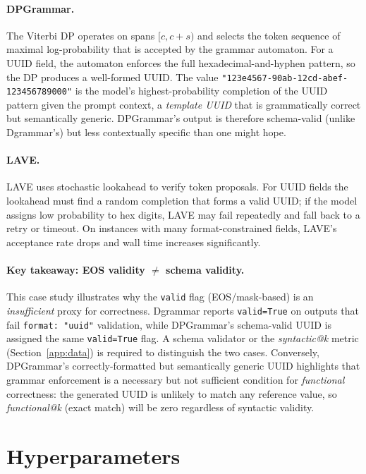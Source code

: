 \paragraph{DPGrammar.}
The Viterbi DP operates on spans $[c, c{+}s)$ and selects the token sequence of maximal log-probability that is accepted by the grammar automaton.
For a UUID field, the automaton enforces the full hexadecimal-and-hyphen pattern, so the DP produces a well-formed UUID.
The value \texttt{"123e4567-90ab-12cd-abef-123456789000"} is the model's highest-probability completion of the UUID pattern given the prompt context, a \emph{template UUID} that is grammatically correct but semantically generic.
DPGrammar's output is therefore schema-valid (unlike Dgrammar's) but less contextually specific than one might hope.

\paragraph{LAVE.}
LAVE uses stochastic lookahead to verify token proposals.
For UUID fields the lookahead must find a random completion that forms a valid UUID; if the model assigns low probability to hex digits, LAVE may fail repeatedly and fall back to a retry or timeout.
On instances with many format-constrained fields, LAVE's acceptance rate drops and wall time increases significantly.

\paragraph{Key takeaway: EOS validity $\neq$ schema validity.}
This case study illustrates why the \texttt{valid} flag (EOS/mask-based) is an \emph{insufficient} proxy for correctness.
Dgrammar reports \texttt{valid=True} on outputs that fail \texttt{format:\,"uuid"} validation, while DPGrammar's schema-valid UUID is assigned the same \texttt{valid=True} flag.
A schema validator or the \emph{syntactic@k} metric (Section~\ref{app:data}) is required to distinguish the two cases.
Conversely, DPGrammar's correctly-formatted but semantically generic UUID highlights that grammar enforcement is a necessary but not sufficient condition for \emph{functional} correctness: the generated UUID is unlikely to match any reference value, so \emph{functional@k} (exact match) will be zero regardless of syntactic validity.

\section{Hyperparameters}
\label{app:hyperparams}

